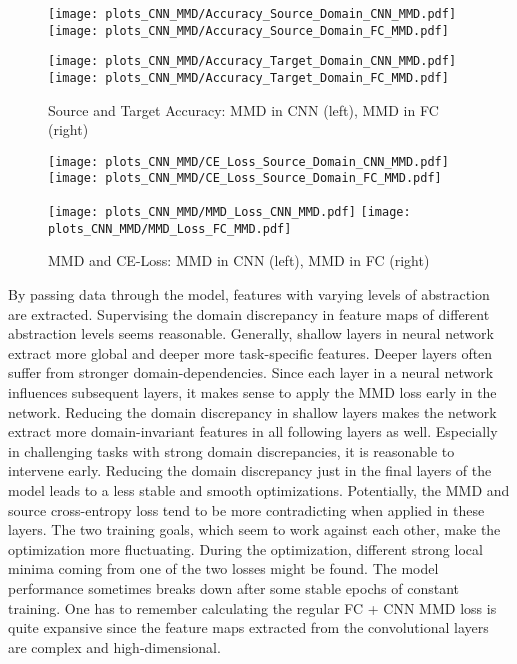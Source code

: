 \begin{figure}[H]
  \centering
  \texttt{[image: plots\_CNN\_MMD/Accuracy\_Source\_Domain\_CNN\_MMD.pdf]}
  \hspace{.3cm}
  \texttt{[image: plots\_CNN\_MMD/Accuracy\_Source\_Domain\_FC\_MMD.pdf]}

  \vspace{.1cm}

  \texttt{[image: plots\_CNN\_MMD/Accuracy\_Target\_Domain\_CNN\_MMD.pdf]}
  \hspace{.3cm}
  \texttt{[image: plots\_CNN\_MMD/Accuracy\_Target\_Domain\_FC\_MMD.pdf]}

  \caption{Source and Target Accuracy: MMD in CNN (left), MMD in FC (right)}
  \label{fig:accuracy_cnn_and_no_cnn_mmd}
\end{figure}

\begin{figure}[H]
  \centering
  \texttt{[image: plots\_CNN\_MMD/CE\_Loss\_Source\_Domain\_CNN\_MMD.pdf]}
  \hspace{.3cm}
  \texttt{[image: plots\_CNN\_MMD/CE\_Loss\_Source\_Domain\_FC\_MMD.pdf]}

  \vspace{.1cm}

  \texttt{[image: plots\_CNN\_MMD/MMD\_Loss\_CNN\_MMD.pdf]}
  \hspace{.1cm}
  \texttt{[image: plots\_CNN\_MMD/MMD\_Loss\_FC\_MMD.pdf]}

  \caption{MMD and CE-Loss: MMD in CNN (left), MMD in FC (right)}
  \label{fig:loss_cnn_and_no_cnn_mmd}
\end{figure}

By passing data through the model, features with varying levels of abstraction are extracted. Supervising the domain discrepancy in feature maps of different abstraction levels seems reasonable. Generally, shallow layers in neural network extract more global and deeper more task-specific features. Deeper layers often suffer from stronger domain-dependencies. Since each layer in a neural network influences subsequent layers, it makes sense to apply the MMD loss early in the network. Reducing the domain discrepancy in shallow layers makes the network extract more domain-invariant features in all following layers as well. Especially in challenging tasks with strong domain discrepancies, it is reasonable to intervene early. Reducing the domain discrepancy just in the final layers of the model leads to a less stable and smooth optimizations. Potentially, the MMD and source cross-entropy loss tend to be more contradicting when applied in these layers. The two training goals, which seem to work against each other, make the optimization more fluctuating. During the optimization, different strong local minima coming from one of the two losses might be found. The model performance sometimes breaks down after some stable epochs of constant training. One has to remember calculating the regular FC + CNN MMD loss is quite expansive since the feature maps extracted from the convolutional layers are complex and high-dimensional.



